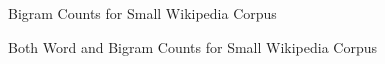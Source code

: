 \begin{figure}[h!]
\centering
\label{fig:bigram}
\caption{Bigram Counts for Small Wikipedia Corpus}
\end{figure}

\begin{figure}[h!]
\centering
\label{fig:both}
\caption{Both Word and Bigram Counts for Small Wikipedia Corpus}
\end{figure}
